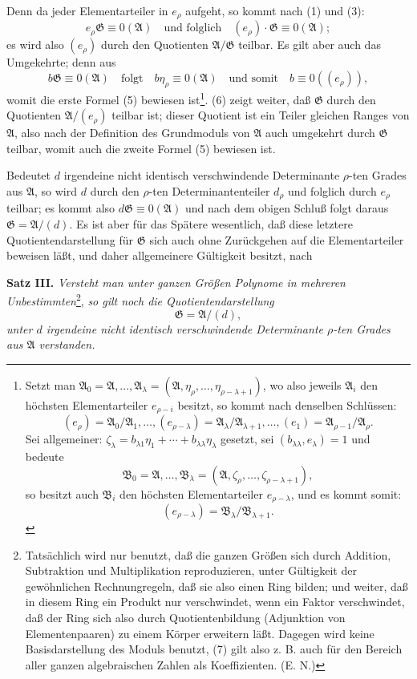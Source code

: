 \documentclass[11pt]{article}
\newcommand{\Amod}{\mathfrak A}
\newcommand{\Bmod}{\mathfrak B}
\newcommand{\Gmod}{\mathfrak G}
\newcommand{\zero}[1]{\equiv 0(#1)}
\begin{document}
Denn da jeder Elementarteiler in $e_\rho$ aufgeht, so kommt nach (1) und (3):
\begin{equation}
 e_\rho\Gmod\zero{\Amod}\quad \text{und folglich}\quad (e_\rho)\cdot\Gmod\zero{\Amod};
\tag{6}
\end{equation}
es wird also $(e_\rho)$ durch den Quotienten $\Amod/\Gmod$ teilbar. Es gilt aber auch das Umgekehrte; denn aus
\[
 b\Gmod\zero{\Amod}
 \quad\text{folgt}\quad b\eta_\rho\zero{\Amod}
 \quad\text{und somit}\quad b\zero{(e_\rho)},
\]
womit die erste Formel (5) bewiesen ist\footnote{Setzt man $\Amod_0=\Amod,\ldots,\Amod_\lambda=(\Amod,\eta_\rho,\ldots,\eta_{\rho-\lambda+1})$, wo also jeweils $\Amod_i$ den höchsten Elementarteiler $e_{\rho-i}$ besitzt, so kommt nach denselben Schlüssen:
\[
 (e_\rho)=\Amod_0/\Amod_1,\ldots,(e_{\rho-\lambda})=\Amod_\lambda/\Amod_{\lambda+1},\ldots,(e_1)=\Amod_{\rho-1}/\Amod_\rho.
\]
Sei allgemeiner: $\zeta_\lambda=b_{\lambda1}\eta_1+\cdots+b_{\lambda\lambda}\eta_\lambda$ gesetzt, sei $(b_{\lambda\lambda},e_\lambda)=1$ und bedeute
\[
 \Bmod_0=\Amod,\ldots,\Bmod_\lambda=(\Amod,\zeta_\rho,\ldots,\zeta_{\rho-\lambda+1}),
\]
so besitzt auch $\Bmod_i$ den höchsten Elementarteiler $e_{\rho-\lambda}$, und es kommt somit:
\[
 (e_{\rho-\lambda})=\Bmod_\lambda/\Bmod_{\lambda+1}.
\]}. (6) zeigt weiter, daß $\Gmod$ durch den Quotienten $\Amod/(e_\rho)$ teilbar ist; dieser Quotient ist ein Teiler gleichen Ranges von $\Amod$, also nach der Definition des Grundmoduls von $\Amod$ auch umgekehrt durch $\Gmod$ teilbar, womit auch die zweite Formel (5) bewiesen ist.

Bedeutet $d$ irgendeine nicht identisch verschwindende Determinante $\rho$-ten Grades aus $\Amod$, so wird $d$ durch den $\rho$-ten Determinantenteiler $d_\rho$ und folglich durch $e_\rho$ teilbar; es kommt also $d\Gmod\zero{\Amod}$ und nach dem obigen Schluß folgt daraus $\Gmod=\Amod/(d)$. Es ist aber für das Spätere wesentlich, daß diese letztere Quotientendarstellung für $\Gmod$ sich auch ohne Zurückgehen auf die Elementarteiler beweisen läßt, und daher allgemeinere Gültigkeit besitzt, nach

\medskip
\noindent\textbf{Satz III.} \emph{Versteht man unter ganzen Größen Polynome in mehreren Unbestimmten}\footnote{Tatsächlich wird nur benutzt, daß die ganzen Größen sich durch Addition, Subtraktion und Multiplikation reproduzieren, unter Gültigkeit der gewöhnlichen Rechnungregeln, daß sie also einen Ring bilden; und weiter, daß in diesem Ring ein Produkt nur verschwindet, wenn ein Faktor verschwindet, daß der Ring sich also durch Quotientenbildung (Adjunktion von Elementenpaaren) zu einem Körper erweitern läßt. Dagegen wird keine Basisdarstellung des Moduls benutzt, (7) gilt also z. B. auch für den Bereich aller ganzen algebraischen Zahlen als Koeffizienten. (E. N.)}, \emph{so gilt noch die Quotientendarstellung}
\begin{equation}
 \Gmod=\Amod/(d),
\tag{7}
\end{equation}
\emph{unter $d$ irgendeine nicht identisch verschwindende Determinante $\rho$-ten Grades aus $\Amod$ verstanden.}
\end{document}
